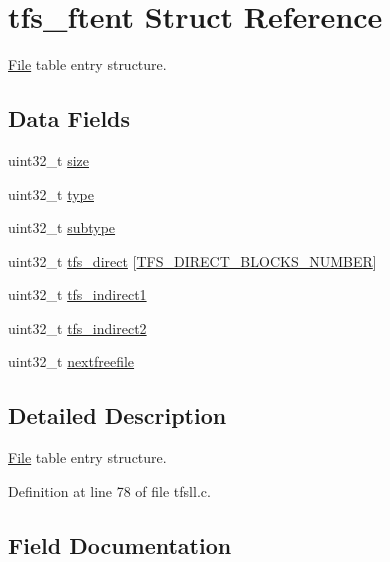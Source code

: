 \hypertarget{structtfs__ftent}{}\section{tfs\+\_\+ftent Struct Reference}
\label{structtfs__ftent}


\hyperlink{struct_file}{File} table entry structure.  


\subsection*{Data Fields}
\begin{DoxyCompactItemize}
\item 
uint32\+\_\+t \hyperlink{structtfs__ftent_ab2c6b258f02add8fdf4cfc7c371dd772}{size}
\item 
uint32\+\_\+t \hyperlink{structtfs__ftent_ad44b615021ed3ccb734fcaf583ef4a03}{type}
\item 
uint32\+\_\+t \hyperlink{structtfs__ftent_aed06f4a516930ca81d204d53c61a1ef3}{subtype}
\item 
uint32\+\_\+t \hyperlink{structtfs__ftent_ac72173305c111f1c618d565e1fcf465d}{tfs\+\_\+direct} \mbox{[}\hyperlink{tfsll_8h_aa22ff5357087db56d08f3b8c0c6f9ad3}{T\+F\+S\+\_\+\+D\+I\+R\+E\+C\+T\+\_\+\+B\+L\+O\+C\+K\+S\+\_\+\+N\+U\+M\+B\+E\+R}\mbox{]}
\item 
uint32\+\_\+t \hyperlink{structtfs__ftent_acf7d5c649c8c0f9cec2a1ed197b3ff4c}{tfs\+\_\+indirect1}
\item 
uint32\+\_\+t \hyperlink{structtfs__ftent_ae66fa913e290bb96328acf2933ef3825}{tfs\+\_\+indirect2}
\item 
uint32\+\_\+t \hyperlink{structtfs__ftent_ae22ee9d0bca474f92a2bb927af36f070}{nextfreefile}
\end{DoxyCompactItemize}


\subsection{Detailed Description}
\hyperlink{struct_file}{File} table entry structure. 

Definition at line 78 of file tfsll.\+c.



\subsection{Field Documentation}
\hypertarget{structtfs__ftent_ae22ee9d0bca474f92a2bb927af36f070}{}
